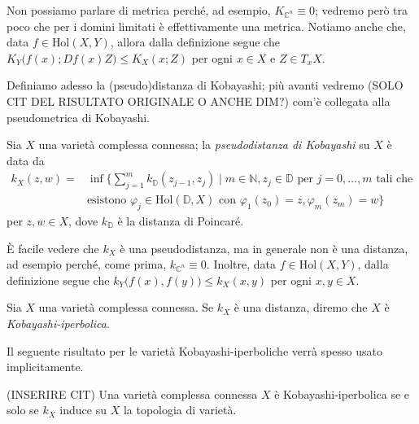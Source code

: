 \begin{oss}
    Non possiamo parlare di metrica perché, ad esempio, $K_{\mathbb{C}^n}\equiv 0$; vedremo però tra poco che per i domini limitati è effettivamente una metrica. Notiamo anche che, data $f \in \text{Hol}(X,Y)$, allora dalla definizione segue che $K_Y\big(f(x);Df(x)Z\big) \le K_X(x;Z)$ per ogni $x \in X$ e $Z \in T_xX$.
\end{oss}

Definiamo adesso la (pseudo)distanza di Kobayashi; più avanti vedremo (SOLO CIT DEL RISULTATO ORIGINALE O ANCHE DIM?) com'è collegata alla pseudometrica di Kobayashi.

\begin{defn}
    Sia $X$ una varietà complessa connessa; la \textit{pseudodistanza di Kobayashi} su $X$ è data da
    \begin{equation}\begin{split}
        k_X(z,w)=&\inf\Bigg\{\sum_{j=1}^m k_{\mathbb{D}}(z_{j-1},z_j) \mid m \in \mathbb{N}, z_j \in \mathbb{D}\text{ per }j=0,\dots,m\text{ tali che}\\
        &\text{esistono }\varphi_j\in \text{Hol}(\mathbb{D},X) \text{ con } \varphi_1(z_0)=z,\varphi_m(z_m)=w\Bigg\}
    \end{split}\end{equation}
    per $z,w \in X$, dove $k_{\mathbb{D}}$ è la distanza di Poincaré.
\end{defn}

\begin{oss} \label{k_lip}
    È facile vedere che $k_X$ è una pseudodistanza, ma in generale non è una distanza, ad esempio perché, come prima, $k_{\mathbb{C}^n}\equiv 0$. Inoltre, data $f \in \text{Hol}(X,Y)$, dalla definizione segue che $k_Y\big(f(x),f(y)\big) \le k_X(x,y)$ per ogni $x,y \in X$.
\end{oss}

\begin{defn}
    Sia $X$ una varietà complessa connessa. Se $k_X$ è una distanza, diremo che $X$ è \textit{Kobayashi-iperbolica}.
\end{defn}

Il seguente risultato per le varietà Kobayashi-iperboliche verrà spesso usato implicitamente.

\begin{prop}
    (INSERIRE CIT) Una varietà complessa connessa $X$ è Kobayashi-iperbolica se e solo se $k_X$ induce su $X$ la topologia di varietà.
\end{prop}

